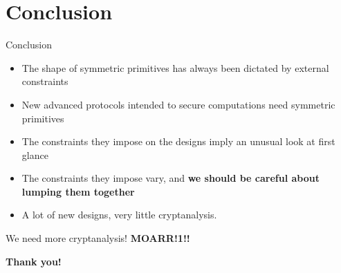 \documentclass[presentation,aspectratio=1610]{beamer}
\begin{document}
\section{Conclusion}



\begin{frame}{Conclusion}
  ~
  {
    \begin{itemize}
    \item The shape of symmetric primitives has always been dictated by \alert{external constraints} \pause
    \item New \alert{advanced protocols} intended to secure \alert{computations} need symmetric primitives \pause
    \item The constraints they impose on the designs imply an \alert{unusual look at first glance} \pause
    \item The constraints they impose \alert{vary}, and \textbf{we should be careful about lumping them together} \pause
      
    \item A lot of new designs, very little cryptanalysis.
    \end{itemize}
  }
  \pause\vspace{1cm}
  
  \begin{center}
    \large{\alert{We need more cryptanalysis! \pause \textbf{MOARR!1!!}}}

    \pause\vspace{1cm}
    \textbf{Thank you!}
  \end{center}
\end{frame}

\appendix



\end{document}

